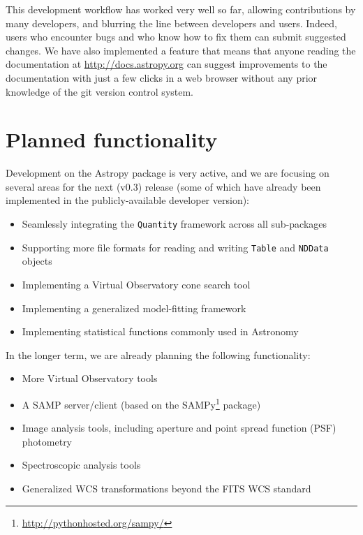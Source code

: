 \documentclass[traditabstract]{aa}
\begin{document}
This development workflow has worked very well so far, allowing contributions
by many developers, and blurring the line between developers and users. Indeed,
users who encounter bugs and who know how to fix them can submit suggested
changes. We have also implemented a feature that means that anyone reading the
documentation at \url{http://docs.astropy.org} can suggest improvements to the
documentation with just a few clicks in a web browser without any prior
knowledge of the git version control system.

\section{Planned functionality}

\label{sec:future}


Development on the Astropy package is very active, and we are focusing on several areas for
the next (v0.3) release (some of which have already been implemented in the
publicly-available developer version):

\begin{itemize}
\item Seamlessly integrating the \texttt{Quantity} framework across all sub-packages
\item Supporting more file formats for reading and writing \texttt{Table} and \texttt{NDData} objects
\item Implementing a Virtual Observatory cone search tool
\item Implementing a generalized model-fitting framework
\item Implementing statistical functions commonly used in Astronomy
\end{itemize}

In the longer term, we are already planning the following functionality:

\begin{itemize}
\item More Virtual Observatory tools
\item A SAMP server/client (based on the SAMPy\footnote{\url{http://pythonhosted.org/sampy/}} package)
\item Image analysis tools, including aperture and point spread function (PSF) photometry
\item Spectroscopic analysis tools
\item Generalized WCS transformations beyond the FITS WCS standard
\end{itemize}
\end{document}
